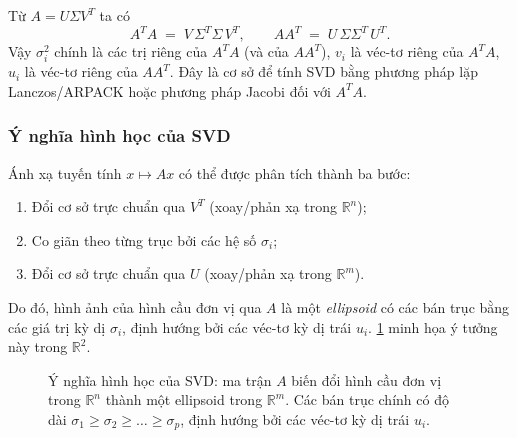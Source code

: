 \begin{remark}
Từ $A = U\Sigma V^T$ ta có
\[
    A^T A \;=\; V\, \Sigma^T \Sigma\, V^T, \qquad
    A A^T \;=\; U\, \Sigma \Sigma^T\, U^T.
\]
Vậy $\sigma_i^2$ chính là các trị riêng của $A^T A$ (và của $A A^T$),
$v_i$ là véc-tơ riêng của $A^T A$, $u_i$ là véc-tơ riêng của $A A^T$.
Đây là cơ sở để tính SVD bằng phương pháp lặp Lanczos/ARPACK hoặc phương
pháp Jacobi đối với $A^T A$.
\end{remark}

\subsubsection*{Ý nghĩa hình học của SVD}

Ánh xạ tuyến tính $x \mapsto Ax$ có thể được phân tích thành ba bước:
\begin{enumerate}
    \item Đổi cơ sở trực chuẩn qua $V^T$ (xoay/phản xạ trong $\mathbb{R}^n$);
    \item Co giãn theo từng trục bởi các hệ số $\sigma_i$;
    \item Đổi cơ sở trực chuẩn qua $U$ (xoay/phản xạ trong $\mathbb{R}^m$).
\end{enumerate}
Do đó, hình ảnh của hình cầu đơn vị qua $A$ là một \emph{ellipsoid} có các bán
trục bằng các giá trị kỳ dị $\sigma_i$, định hướng bởi các véc-tơ kỳ dị trái
$u_i$. \cref{fig:svd-geometry} minh họa ý tưởng này trong $\mathbb{R}^2$.

\begin{figure}[ht]
\centering
{}
\caption{Ý nghĩa hình học của SVD: ma trận $A$ biến đổi hình cầu đơn vị
trong $\mathbb{R}^n$ thành một ellipsoid trong $\mathbb{R}^m$. Các bán trục
chính có độ dài $\sigma_1 \ge \sigma_2 \ge \dots \ge \sigma_p$, định hướng
bởi các véc-tơ kỳ dị trái $u_i$.}\label{fig:svd-geometry}
\end{figure}

